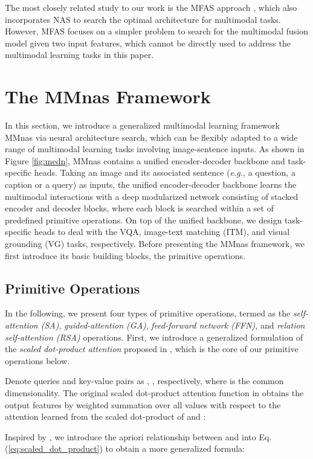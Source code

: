 \documentclass[sigconf]{acmart}
\begin{document}
The most closely related study to our work is the MFAS approach \cite{perez2019mfas}, which also incorporates NAS to search the optimal architecture for multimodal tasks. However, MFAS focuses on a simpler problem to search for the multimodal fusion model given two input features, which cannot be directly used to address the multimodal learning tasks in this paper.


\section{The MMnas Framework}
In this section, we introduce a generalized multimodal learning framework MMnas via neural architecture search, which can be flexibly adapted to a wide range of multimodal learning tasks involving image-sentence inputs. As shown in Figure \ref{fig:medn}, MMnas contains a unified encoder-decoder backbone and task-specific heads. Taking an image and its associated sentence (\emph{e.g.}, a question, a caption or a query) as inputs, the unified encoder-decoder backbone learns the multimodal interactions with a deep modularized network consisting of stacked encoder and decoder blocks, where each block is searched within a set of predefined primitive operations. On top of the unified backbone, we design task-specific heads to deal with the VQA, image-text matching (ITM), and visual grounding (VG) tasks, respectively. Before presenting the MMnas framework, we first introduce its basic building blocks, the primitive operations.

\subsection{Primitive Operations}
In the following, we present four types of primitive operations, termed as the \emph{self-attention (SA)}, \emph{guided-attention (GA)}, \emph{feed-forward network (FFN)}, and \emph{relation self-attention (RSA)} operations. First, we introduce a {generalized formulation} of the \emph{scaled dot-product attention} proposed in \cite{vaswani2017attention}, which is the core of our primitive operations below.

Denote  queries and  key-value pairs as , ,  respectively, where  is the common dimensionality. The original scaled dot-product attention function in \cite{vaswani2017attention} obtains the output features  by weighted summation over all values  with respect to the attention learned from the scaled dot-product of  and :

Inspired by \cite{hu2018relation}, we introduce the apriori relationship  between  and  into Eq.(\ref{eq:scaled_dot_product}) to obtain a more generalized formula:
\end{document}

